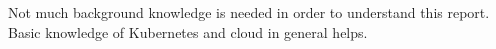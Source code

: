\documentclass[Report.tex]{subfiles}
\begin{document}
Not much background knowledge is needed in order to understand this report. Basic knowledge of Kubernetes and cloud in general helps.
\end{document}
